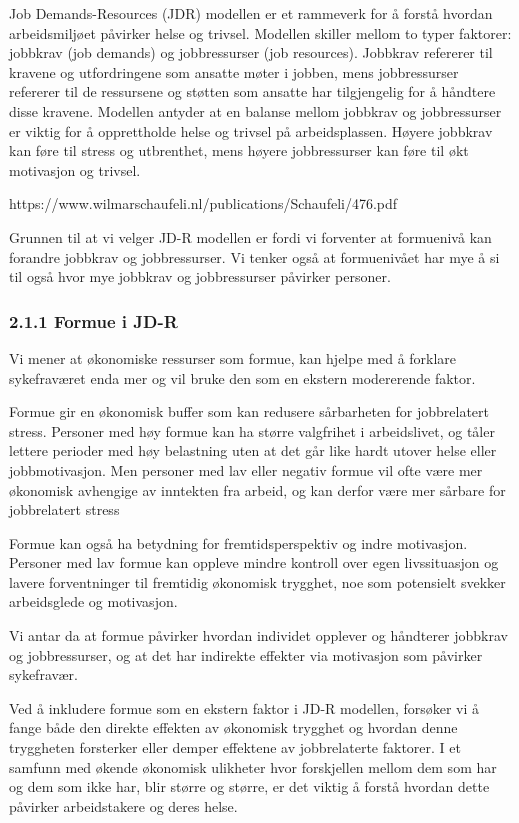 \documentclass[
  12pt,
  a4paper,
  DIV=11,
  numbers=noendperiod]{scrartcl}
\begin{document}
Job Demands-Resources (JDR) modellen er et rammeverk for å forstå
hvordan arbeidsmiljøet påvirker helse og trivsel. Modellen skiller
mellom to typer faktorer: jobbkrav (job demands) og jobbressurser (job
resources). Jobbkrav refererer til kravene og utfordringene som ansatte
møter i jobben, mens jobbressurser refererer til de ressursene og
støtten som ansatte har tilgjengelig for å håndtere disse kravene.
Modellen antyder at en balanse mellom jobbkrav og jobbressurser er
viktig for å opprettholde helse og trivsel på arbeidsplassen. Høyere
jobbkrav kan føre til stress og utbrenthet, mens høyere jobbressurser
kan føre til økt motivasjon og trivsel.

https://www.wilmarschaufeli.nl/publications/Schaufeli/476.pdf

Grunnen til at vi velger JD-R modellen er fordi vi forventer at
formuenivå kan forandre jobbkrav og jobbressurser. Vi tenker også at
formuenivået har mye å si til også hvor mye jobbkrav og jobbressurser
påvirker personer.

\subsubsection{2.1.1 Formue i JD-R}\label{formue-i-jd-r}

Vi mener at økonomiske ressurser som formue, kan hjelpe med å forklare
sykefraværet enda mer og vil bruke den som en ekstern modererende
faktor.

Formue gir en økonomisk buffer som kan redusere sårbarheten for
jobbrelatert stress. Personer med høy formue kan ha større valgfrihet i
arbeidslivet, og tåler lettere perioder med høy belastning uten at det
går like hardt utover helse eller jobbmotivasjon. Men personer med lav
eller negativ formue vil ofte være mer økonomisk avhengige av inntekten
fra arbeid, og kan derfor være mer sårbare for jobbrelatert stress

Formue kan også ha betydning for fremtidsperspektiv og indre motivasjon.
Personer med lav formue kan oppleve mindre kontroll over egen
livssituasjon og lavere forventninger til fremtidig økonomisk trygghet,
noe som potensielt svekker arbeidsglede og motivasjon.

Vi antar da at formue påvirker hvordan individet opplever og håndterer
jobbkrav og jobbressurser, og at det har indirekte effekter via
motivasjon som påvirker sykefravær.

Ved å inkludere formue som en ekstern faktor i JD-R modellen, forsøker
vi å fange både den direkte effekten av økonomisk trygghet og hvordan
denne tryggheten forsterker eller demper effektene av jobbrelaterte
faktorer. I et samfunn med økende økonomisk ulikheter hvor forskjellen
mellom dem som har og dem som ikke har, blir større og større, er det
viktig å forstå hvordan dette påvirker arbeidstakere og deres helse.
\end{document}
